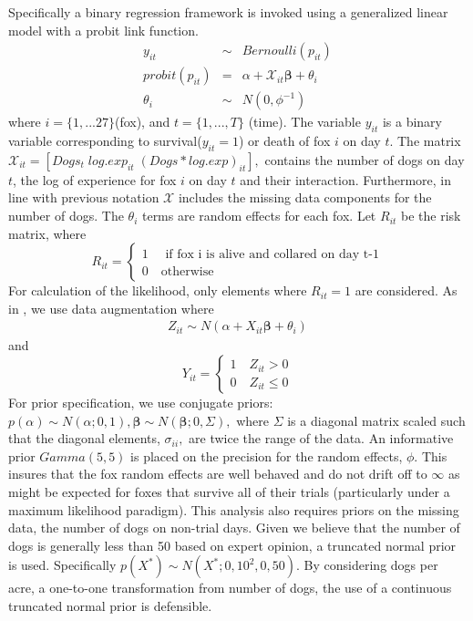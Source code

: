 \documentclass[aoas,preprint]{imsart}
\numberwithin{equation}{section}
\theoremstyle{plain}
\begin{document}
Specifically a binary regression framework is invoked using a generalized linear model with a probit link function.
\begin{eqnarray}
y_{it} &\sim& Bernoulli(p_{it}) \\
probit(p_{it}) & = & \alpha + \mathcal{X}_{it}\boldsymbol{\beta} + \theta_{i} \\
\theta_{i} &\sim& N(0, \phi^{-1})
\end{eqnarray}
where $i = \{1,...27\} $(fox), and $t= \{1,...,T\}$ (time). The variable $y_{it}$ is a binary variable corresponding to survival($y_{it}=1$) or death of fox $i$ on day $t$. The matrix $\mathcal{X}_{it} = [Dogs_t\; log.exp_{it}\; (Dogs*log.exp)_{it}],$ contains the number of dogs on day $t$, the log of experience for fox $i$ on day $t$ and their interaction. Furthermore, in line with previous notation $\mathcal{X}$ includes the missing data components for the number of dogs. The $\theta_i$ terms are random effects for each fox. Let $R_{it}$ be the risk matrix, where
\[
    R_{it}=\left\{
                \begin{array}{ll}
                  1 \quad \text{ if fox i is alive and collared on day t-1}\\
                  0 \quad \text{otherwise}
                \end{array}
              \right.
  \]
  For calculation of the likelihood, only elements where $R_{it}=1$ are considered. As in \cite{albert}, we use data augmentation where 
  \begin{eqnarray}
  Z_{it} \sim N( \alpha + X_{it}\boldsymbol{\beta} +\theta_{i})
  \end{eqnarray}
  and
\[
    Y_{it}=\left\{
                \begin{array}{ll}
                  1 \quad  Z_{it} > 0\\
                  0 \quad Z_{it} \leq 0
                \end{array}
              \right.
  \]
  For prior specification, we use conjugate priors: $p(\alpha) \sim N(\alpha;0,1), \boldsymbol{\beta} \sim N(\boldsymbol{\beta};0,\Sigma),$ where $\Sigma$ is a diagonal matrix scaled such that the diagonal elements, $\sigma_{ii},$ are twice the range of the data. An informative prior $Gamma(5,5)$ is placed on the precision for the random effects, $\phi$. This insures that the fox random effects are well behaved and do not drift off to $\infty$ as might be expected for foxes that survive all of their trials (particularly under a maximum likelihood paradigm). This analysis also requires priors on the missing data, the number of dogs on non-trial days. Given we believe that the number of dogs is generally less than 50 based on expert opinion, a truncated normal prior is used. Specifically $p(X^{*}) \sim N(X^{*}; 0 ,10^2,0,50)$. By considering dogs per acre, a one-to-one transformation from number of dogs, the use of a continuous truncated normal prior is defensible. 
  
\end{document}
